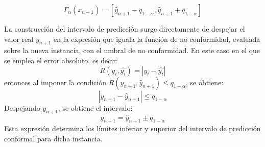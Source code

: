 \begin{enumerate}
    $$
    \Gamma_\alpha(x_{n+1})=
        \left[ 
            \hat{y}_{n+1} - q_{1-\alpha}, 
            \hat{y}_{n+1} + q_{1-\alpha} 
        \right]
    $$

    La construcción del intervalo de predicción surge directamente de despejar el valor real $y_{n+1}$ en la
    expresión que iguala la función de no conformidad, evaluada sobre la nueva instancia, con el umbral de 
    no conformidad.
    En este caso en el que se emplea el error absoluto, es decir:
    $$
    R(y_i, \hat{y_i}) = | y_i - \hat{y_i} |
    $$
    entonces al imponer la condición $R(y_{n+1}, \hat{y}_{n+1}) \le q_{1-\alpha}$, se obtiene: 
    $$
    |y_{n+1}-\hat{y}_{n+1}| \le q_{1-\alpha}
    $$
    Despejando $y_{n+1}$, se obtiene el intervalo:
    $$
    y_{n+1} = \hat{y}_{n+1} \pm q_{1-\alpha}
    $$
    Esta expresión determina los límites inferior y superior del intervalo de predicción conformal para dicha
    instancia.

\end{enumerate}
